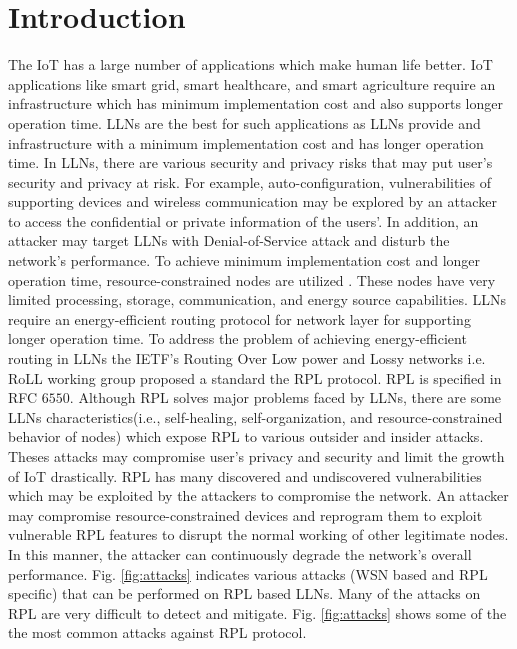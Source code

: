 \documentclass[conference, a4paper]{IEEEtran}
\begin{document}
\section{Introduction}
%
 The IoT\cite{ashton2009internet} has a large number of applications which make human life better. IoT applications like smart grid, smart healthcare, and smart agriculture require an infrastructure which has minimum implementation cost\cite{sethi2017internet} and also supports longer operation time. LLNs are the best for such applications as LLNs provide and infrastructure with a minimum implementation cost\cite{sobral2019routing} and has longer operation time. In LLNs, there are various security and privacy risks that may put user's security and privacy at risk. For example, auto-configuration, vulnerabilities of supporting devices and wireless communication may be explored by an attacker to access the confidential or private information of the users'. In addition, an attacker may target LLNs with Denial-of-Service attack and disturb the network's performance. To achieve minimum implementation cost and longer operation time, resource-constrained nodes are utilized . These nodes have very limited processing, storage, communication, and energy source capabilities. LLNs require an energy-efficient routing protocol for  network layer for supporting longer operation time. To address the problem of achieving energy-efficient routing in LLNs the IETF's Routing Over Low power and Lossy networks i.e. RoLL working group proposed a standard the RPL protocol. RPL is specified in RFC $ 6550 $\cite{rfc6550}. Although RPL solves major problems faced by LLNs, there are some LLNs characteristics(i.e., self-healing, self-organization, and resource-constrained behavior of nodes) which expose RPL to various outsider and insider attacks. Theses attacks may compromise user's privacy and security and limit the growth of IoT drastically. RPL has many discovered and undiscovered vulnerabilities which may be exploited by the attackers to compromise the network. An attacker may compromise resource-constrained devices and reprogram them to exploit vulnerable RPL features to disrupt the normal working of other legitimate nodes. In this manner, the attacker can continuously degrade the network’s overall performance. Fig. \ref{fig:attacks} indicates various attacks (WSN based and RPL specific) that can be performed on RPL based LLNs. Many of the attacks on RPL are very difficult to detect and mitigate. Fig. \ref{fig:attacks} shows some of the the most common attacks against RPL protocol.
\end{document}
